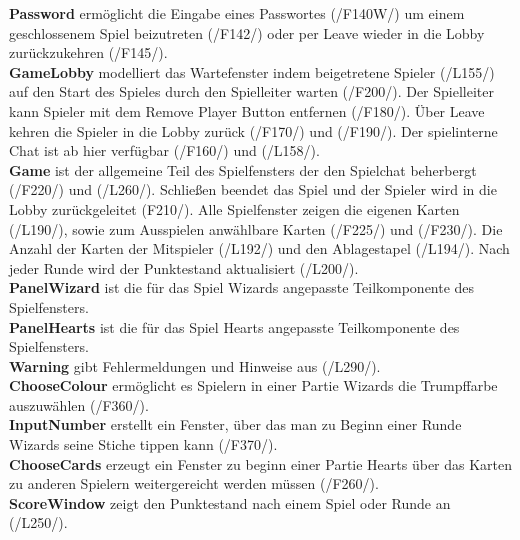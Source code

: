 \documentclass{article}
\begin{document}
			\textbf{Password} ermöglicht die Eingabe eines Passwortes (/F140W/) um einem geschlossenem Spiel beizutreten (/F142/) oder  per Leave wieder in die Lobby zurückzukehren (/F145/). \\
			\textbf{GameLobby} modelliert das Wartefenster indem beigetretene Spieler (/L155/) auf den Start des Spieles durch den Spielleiter warten (/F200/). Der Spielleiter kann Spieler mit dem Remove Player Button entfernen (/F180/). Über Leave kehren die Spieler in die Lobby zurück (/F170/) und (/F190/). Der spielinterne Chat ist ab hier verfügbar (/F160/) und (/L158/). \\
			\textbf{Game} ist der allgemeine Teil des Spielfensters der den Spielchat beherbergt (/F220/) und (/L260/). Schließen beendet das Spiel und der Spieler wird in die Lobby zurückgeleitet (F210/). Alle Spielfenster zeigen die eigenen Karten (/L190/), sowie zum Ausspielen anwählbare Karten (/F225/) und (/F230/). Die Anzahl der Karten der Mitspieler (/L192/) und den Ablagestapel (/L194/). Nach jeder Runde wird der Punktestand  aktualisiert (/L200/).\\
			\textbf{PanelWizard} ist die für das Spiel Wizards angepasste Teilkomponente des Spielfensters.  \\
			\textbf{PanelHearts} ist die für das Spiel Hearts angepasste Teilkomponente des Spielfensters. \\
			\textbf{Warning} gibt Fehlermeldungen und Hinweise aus (/L290/). \\
			\textbf{ChooseColour} ermöglicht es Spielern in einer Partie Wizards die Trumpffarbe auszuwählen (/F360/). \\
			\textbf{InputNumber} erstellt ein Fenster, über das man zu Beginn einer Runde Wizards seine Stiche tippen kann (/F370/). \\
			\textbf{ChooseCards} erzeugt ein Fenster zu beginn einer Partie Hearts über das Karten zu anderen Spielern weitergereicht werden müssen (/F260/). \\
			\textbf{ScoreWindow} zeigt den Punktestand nach einem Spiel oder Runde an (/L250/).\\
\end{document}
